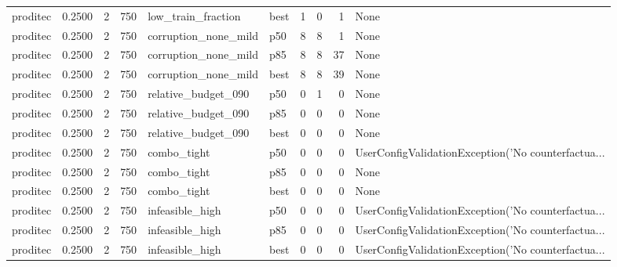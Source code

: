 \begin{tabular}{lrrrllrrrl}
proditec &    0.2500 &    2 &    750 &   low\_train\_fraction &   best &               1 &          0 &       1 &                                               None \\
proditec &    0.2500 &    2 &    750 & corruption\_none\_mild &    p50 &               8 &          8 &       1 &                                               None \\
proditec &    0.2500 &    2 &    750 & corruption\_none\_mild &    p85 &               8 &          8 &      37 &                                               None \\
proditec &    0.2500 &    2 &    750 & corruption\_none\_mild &   best &               8 &          8 &      39 &                                               None \\
proditec &    0.2500 &    2 &    750 &  relative\_budget\_090 &    p50 &               0 &          1 &       0 &                                               None \\
proditec &    0.2500 &    2 &    750 &  relative\_budget\_090 &    p85 &               0 &          0 &       0 &                                               None \\
proditec &    0.2500 &    2 &    750 &  relative\_budget\_090 &   best &               0 &          0 &       0 &                                               None \\
proditec &    0.2500 &    2 &    750 &          combo\_tight &    p50 &               0 &          0 &       0 & UserConfigValidationException('No counterfactua... \\
proditec &    0.2500 &    2 &    750 &          combo\_tight &    p85 &               0 &          0 &       0 &                                               None \\
proditec &    0.2500 &    2 &    750 &          combo\_tight &   best &               0 &          0 &       0 &                                               None \\
proditec &    0.2500 &    2 &    750 &      infeasible\_high &    p50 &               0 &          0 &       0 & UserConfigValidationException('No counterfactua... \\
proditec &    0.2500 &    2 &    750 &      infeasible\_high &    p85 &               0 &          0 &       0 & UserConfigValidationException('No counterfactua... \\
proditec &    0.2500 &    2 &    750 &      infeasible\_high &   best &               0 &          0 &       0 & UserConfigValidationException('No counterfactua... \\

\end{tabular}

